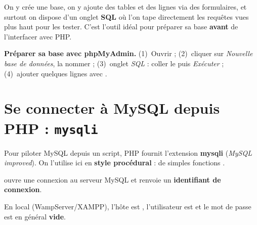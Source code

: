 On y crée une base, on y ajoute des tables et des lignes via des formulaires, et
surtout on dispose d'un onglet \textbf{SQL} où l'on tape directement les requêtes
vues plus haut pour les tester. C'est l'outil idéal pour préparer sa base
\textbf{avant} de l'interfacer avec PHP.

\begin{methode}
\textbf{Préparer sa base avec phpMyAdmin.} (1)~Ouvrir
 ; (2)~cliquer sur \emph{Nouvelle base de
données}, la nommer  ; (3)~onglet \emph{SQL} : coller le
 puis \emph{Exécuter} ; (4)~ajouter quelques lignes
avec .
\end{methode}

\section{Se connecter à MySQL depuis PHP : \texttt{mysqli}}

Pour piloter MySQL depuis un script, PHP fournit l'extension \textbf{mysqli}
(\emph{MySQL improved}). On l'utilise ici en \textbf{style procédural} : de
simples fonctions .

\begin{definition}
 ouvre une
connexion au serveur MySQL et renvoie un \textbf{identifiant de connexion}.
\end{definition}

En local (WampServer/XAMPP), l'hôte est , l'utilisateur est
 et le mot de passe est en général \textbf{vide}.


